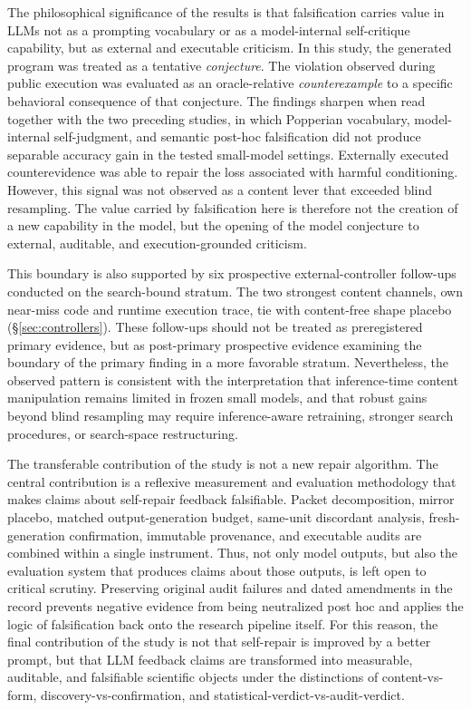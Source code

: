\documentclass{article}
\numberwithin{equation}{section}  %
\theoremstyle{definition}
\begin{document}
The philosophical significance of the results is that falsification carries value in LLMs not
as a prompting vocabulary or as a model-internal self-critique capability, but as external and
executable criticism. In this study, the generated program was treated as a tentative
\emph{conjecture}. The violation observed during public execution was evaluated as an
oracle-relative \emph{counterexample} to a specific behavioral consequence of that
conjecture. The findings sharpen when read together with the two preceding
studies, in which Popperian vocabulary, model-internal self-judgment, and semantic post-hoc
falsification did not produce separable accuracy gain in the tested small-model settings.
Externally executed counterevidence was able to repair the loss associated with harmful
conditioning. However, this signal was not observed as a content lever that exceeded blind
resampling. The value carried by falsification here is therefore not the creation of a new
capability in the model, but the opening of the model conjecture to external, auditable, and
execution-grounded criticism.

This boundary is also supported by six prospective external-controller follow-ups conducted
on the search-bound stratum. The two strongest content channels, own near-miss code and
runtime execution trace, tie with content-free shape placebo
(\S\ref{sec:controllers}). These follow-ups should not be treated as preregistered primary
evidence, but as post-primary prospective evidence examining the boundary of the primary
finding in a more favorable stratum. Nevertheless, the observed pattern is consistent with the
interpretation that inference-time content manipulation remains limited in frozen small
models, and that robust gains beyond blind resampling may require inference-aware retraining,
stronger search procedures, or search-space restructuring.

The transferable contribution of the study is not a new repair algorithm. The central
contribution is a reflexive measurement and evaluation methodology that makes claims about
self-repair feedback falsifiable. Packet decomposition, mirror placebo, matched
output-generation budget, same-unit discordant analysis, fresh-generation confirmation,
immutable provenance, and executable audits are combined within a single instrument. Thus,
not only model outputs, but also the evaluation system that produces claims about those
outputs, is left open to critical scrutiny. Preserving original audit failures and dated
amendments in the record prevents negative evidence from being neutralized post hoc and
applies the logic of falsification back onto the research pipeline itself. For this reason,
the final contribution of the study is not that self-repair is improved by a better prompt,
but that LLM feedback claims are transformed into measurable, auditable, and falsifiable
scientific objects under the distinctions of content-vs-form, discovery-vs-confirmation, and
statistical-verdict-vs-audit-verdict.
\end{document}
